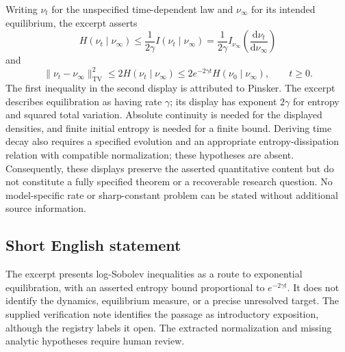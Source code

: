 \documentclass[11pt]{article}
\begin{document}
Writing \(\nu_t\) for the unspecified time-dependent law and \(\nu_\infty\) for its intended equilibrium, the excerpt asserts
\[
H(\nu_t\mid\nu_\infty)
\leq\frac{1}{2\gamma}I(\nu_t\mid\nu_\infty)
=\frac{1}{2\gamma}I_{\nu_\infty}\!\left(\frac{\mathrm d\nu_t}{\mathrm d\nu_\infty}\right)
\]
and
\[
\|\nu_t-\nu_\infty\|_{\mathrm{TV}}^2
\leq2H(\nu_t\mid\nu_\infty)
\leq2e^{-2\gamma t}H(\nu_0\mid\nu_\infty),
\qquad t\geq0.
\]
The first inequality in the second display is attributed to Pinsker. The excerpt describes equilibration as having rate \(\gamma\); its display has exponent \(2\gamma\) for entropy and squared total variation. Absolute continuity is needed for the displayed densities, and finite initial entropy is needed for a finite bound. Deriving time decay also requires a specified evolution and an appropriate entropy-dissipation relation with compatible normalization; these hypotheses are absent. Consequently, these displays preserve the asserted quantitative content but do not constitute a fully specified theorem or a recoverable research question. No model-specific rate or sharp-constant problem can be stated without additional source information.
\subsection{Short English statement}
The excerpt presents log-Sobolev inequalities as a route to exponential equilibration, with an asserted entropy bound proportional to \(e^{-2\gamma t}\). It does not identify the dynamics, equilibrium measure, or a precise unresolved target. The supplied verification note identifies the passage as introductory exposition, although the registry labels it open. The extracted normalization and missing analytic hypotheses require human review.
\end{document}
